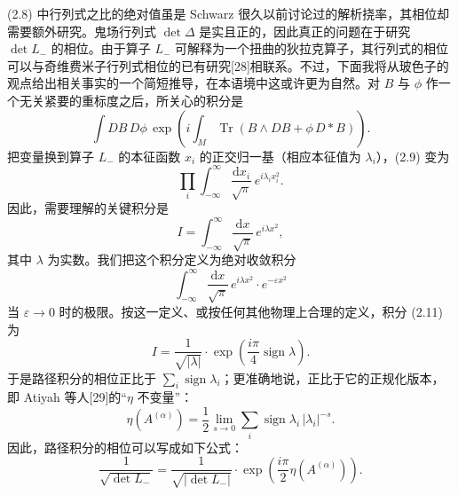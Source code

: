 \documentclass[11pt,a4paper]{article}
\begin{document}
(2.8) 中行列式之比的绝对值虽是 Schwarz 很久以前讨论过的解析挠率，其相位却需要额外研究。鬼场行列式 $\det\Delta$ 是实且正的，因此真正的问题在于研究 $\det L_-$ 的相位。由于算子 $L_-$ 可解释为一个扭曲的狄拉克算子，其行列式的相位可以与奇维费米子行列式相位的已有研究[28]相联系。不过，下面我将从玻色子的观点给出相关事实的一个简短推导，在本语境中这或许更为自然。对 $B$ 与 $\phi$ 作一个无关紧要的重标度之后，所关心的积分是
\begin{equation}
    \int DB\,D\phi\,\exp\left(i\int_M\operatorname{Tr}\left(B\wedge DB+\phi\,D{*}B\right)\right).
    \tag{2.9}
\end{equation}
把变量换到算子 $L_-$ 的本征函数 $x_i$ 的正交归一基（相应本征值为 $\lambda_i$），(2.9) 变为
\begin{equation}
    \prod_i\int_{-\infty}^{\infty}\frac{\mathrm{d}x_i}{\sqrt{\pi}}\,e^{i\lambda_ix_i^2}.
    \tag{2.10}
\end{equation}
因此，需要理解的关键积分是
\begin{equation}
    I=\int_{-\infty}^{\infty}\frac{\mathrm{d}x}{\sqrt{\pi}}\,e^{i\lambda x^2},
    \tag{2.11}
\end{equation}
其中 $\lambda$ 为实数。我们把这个积分定义为绝对收敛积分
\begin{equation}
    \int_{-\infty}^{\infty}\frac{\mathrm{d}x}{\sqrt{\pi}}\,e^{i\lambda x^2}\cdot e^{-\varepsilon x^2}
    \tag{2.12}
\end{equation}
当 $\varepsilon\to0$ 时的极限。按这一定义、或按任何其他物理上合理的定义，积分 (2.11) 为
\begin{equation}
    I=\frac{1}{\sqrt{|\lambda|}}\cdot\exp\left(\frac{i\pi}{4}\operatorname{sign}\lambda\right).
    \tag{2.13}
\end{equation}
于是路径积分的相位正比于 $\sum_i\operatorname{sign}\lambda_i$；更准确地说，正比于它的正规化版本，即 Atiyah 等人[29]的“$\eta$ 不变量”：
\begin{equation}
    \eta(A^{(\alpha)})=\frac{1}{2}\lim_{s\to0}\sum_i\operatorname{sign}\lambda_i\,|\lambda_i|^{-s}.
    \tag{2.14}
\end{equation}
因此，路径积分的相位可以写成如下公式：
\begin{equation}
    \frac{1}{\sqrt{\det L_-}}=\frac{1}{\sqrt{|\det L_-|}}\cdot\exp\left(\frac{i\pi}{2}\eta(A^{(\alpha)})\right).
    \tag{2.15}
\end{equation}
\end{document}
